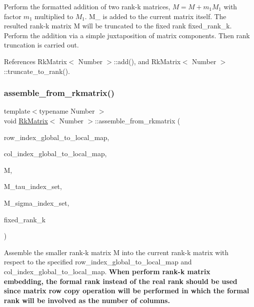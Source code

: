 Perform the formatted addition of two rank-\/k matrices, $M = M + m_1 M_1$ with factor $m_1$ multiplied to $M_1$. {\ttfamily M\+\_} is added to the current matrix itself. The resulted rank-\/k matrix {\ttfamily M} will be truncated to the fixed rank {\ttfamily fixed\+\_\+rank\+\_\+k}. Perform the addition via a simple juxtaposition of matrix components. Then rank truncation is carried out.

References Rk\+Matrix$<$ Number $>$\+::add(), and Rk\+Matrix$<$ Number $>$\+::truncate\+\_\+to\+\_\+rank().

\mbox{\label{classRkMatrix_a9ff620f9f71181c794e129d71d76da7c}} 
\subsubsection{\texorpdfstring{assemble\+\_\+from\+\_\+rkmatrix()}{assemble\_from\_rkmatrix()}}
{\footnotesize\ttfamily template$<$typename Number $>$ \\
void \hyperlink{classRkMatrix}{Rk\+Matrix}$<$ Number $>$\+::assemble\+\_\+from\+\_\+rkmatrix (\begin{DoxyParamCaption}\item[{const std\+::map$<$ types\+::global\+\_\+dof\+\_\+index, size\+\_\+t $>$ \&}]{row\+\_\+index\+\_\+global\+\_\+to\+\_\+local\+\_\+map,  }\item[{const std\+::map$<$ types\+::global\+\_\+dof\+\_\+index, size\+\_\+t $>$ \&}]{col\+\_\+index\+\_\+global\+\_\+to\+\_\+local\+\_\+map,  }\item[{const \hyperlink{classRkMatrix}{Rk\+Matrix}$<$ Number $>$ \&}]{M,  }\item[{const std\+::vector$<$ types\+::global\+\_\+dof\+\_\+index $>$ \&}]{M\+\_\+tau\+\_\+index\+\_\+set,  }\item[{const std\+::vector$<$ types\+::global\+\_\+dof\+\_\+index $>$ \&}]{M\+\_\+sigma\+\_\+index\+\_\+set,  }\item[{const \hyperlink{classRkMatrix_add060bfc3a4cc77f858c3d6dd58cadd5}{size\+\_\+type}}]{fixed\+\_\+rank\+\_\+k }\end{DoxyParamCaption})}

Assemble the smaller rank-\/k matrix {\ttfamily M} into the current rank-\/k matrix with respect to the specified {\ttfamily row\+\_\+index\+\_\+global\+\_\+to\+\_\+local\+\_\+map} and {\ttfamily col\+\_\+index\+\_\+global\+\_\+to\+\_\+local\+\_\+map}. {\bfseries When perform rank-\/k matrix embedding, the formal rank instead of the real rank should be used since matrix row copy operation will be performed in which the formal rank will be involved as the number of columns.}

